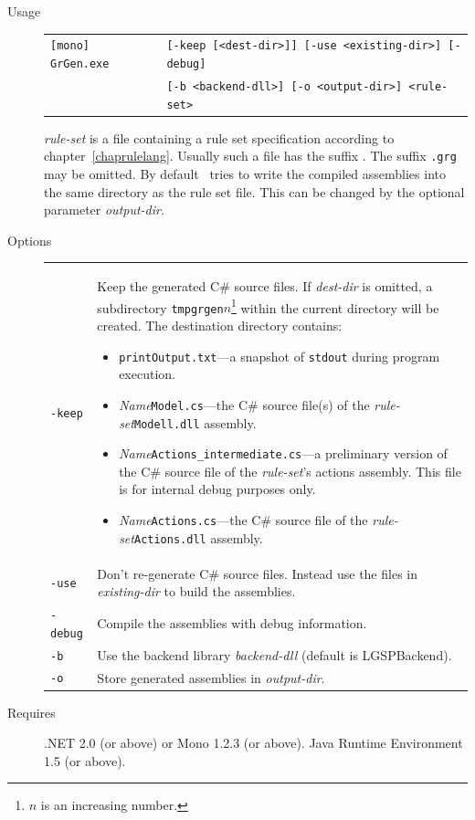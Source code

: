 \begin{description}
  \item[Usage] \begin{tabular*}{\linewidth}{@{}l@{}l}\texttt{[mono] GrGen.exe } & \texttt{[-keep [<dest-dir>]] [-use <existing-dir>] [-debug]}\\
        &\texttt{[-b <backend-dll>] [-o <output-dir>] <rule-set>}\end{tabular*}
    \emph{rule-set} is a file containing a rule set specification according to chapter~\ref{chaprulelang}. Usually such a file has the suffix \texttt{}. The suffix \texttt{.grg} may be omitted.
By default \GrG\ tries to write the compiled assemblies into the same directory as the rule set file. This can be changed by the optional parameter \emph{output-dir}.
  \item[Options] \mbox{} 
    \begin{tabularx}{\linewidth}{lX}
      \texttt{-keep} & Keep the generated C\# source files. If \emph{dest-dir} is omitted, a subdirectory \texttt{tmpgrgen$n$}\footnote{$n$ is an increasing number.} within the current directory will be created. The destination directory contains:
\begin{itemize}
  \item \texttt{printOutput.txt}---a snapshot of \texttt{stdout} during program execution.
  \item \emph{Name}\texttt{Model.cs}---the C\# source file(s) of the \emph{rule-set}\texttt{Modell.dll} assembly.
  \item \emph{Name}\texttt{Actions\_intermediate.cs}---a preliminary version of the C\# source file of the \emph{rule-set}'s actions assembly. This file is for internal debug purposes only.
  \item \emph{Name}\texttt{Actions.cs}---the C\# source file of the \emph{rule-set}\texttt{Actions.dll} assembly.
\end{itemize}\\
      \texttt{-use} & Don't re-generate C\# source files. Instead use the files in \emph{existing-dir} to build the assemblies.\\	
      \texttt{-debug} & Compile the assemblies with debug information.\\
      \texttt{-b} & Use the backend library \emph{backend-dll} (default is LGSPBackend).\\
      \texttt{-o} & Store generated assemblies in \emph{output-dir}.
    \end{tabularx}
  \item[Requires] .NET 2.0 (or above) or Mono 1.2.3 (or above). Java Runtime Environment 1.5 (or above).
\end{description}


